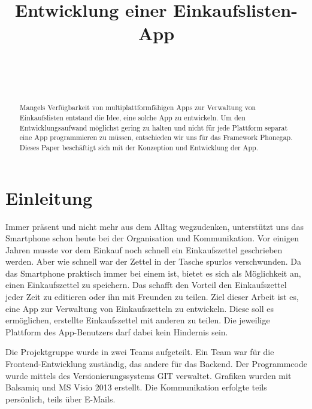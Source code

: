 \documentclass[10pt, conference, compsocconf]{IEEEtran}
\begin{document}
\title{Entwicklung einer Einkaufslisten-App}


\author{
\\
\and
{}
\\
}

\maketitle


\begin{abstract}
Mangels Verf\"ugbarkeit von multiplattformf\"ahigen Apps zur Verwaltung von Einkaufslisten entstand die Idee, eine solche App zu entwickeln. Um den Entwicklungsaufwand m\"oglichst gering zu halten und nicht f\"ur jede Plattform separat eine App programmieren zu müssen, entschieden wir uns f\"ur das Framework Phonegap. Dieses Paper besch\"aftigt sich mit der Konzeption und Entwicklung der App.   
\end{abstract}

\IEEEpeerreviewmaketitle

\section{Einleitung}
Immer pr\"asent und nicht mehr aus dem Alltag wegzudenken, unterst\"utzt  uns das Smartphone schon heute bei der Organisation und Kommunikation. 
Vor einigen Jahren musste vor dem Einkauf noch schnell ein Einkaufszettel geschrieben werden. 
Aber wie schnell war der Zettel  in der Tasche spurlos verschwunden. 
Da das Smartphone praktisch immer bei einem ist, bietet es sich als M\"oglichkeit an, einen Einkaufszettel zu speichern. 
Das schafft den Vorteil den Einkaufszettel jeder Zeit zu editieren oder ihn mit Freunden zu teilen. 
Ziel dieser Arbeit ist es, eine App zur Verwaltung von Einkaufszetteln zu entwickeln.
Diese soll es erm\"oglichen, erstellte Einkaufszettel mit anderen zu teilen.
Die jeweilige Plattform des App-Benutzers darf dabei kein Hindernis sein.

Die Projektgruppe wurde in zwei Teams aufgeteilt. 
Ein Team war f\"ur die Frontend-Entwicklung zust\"andig, das andere f\"ur das Backend. 
Der Programmcode wurde mittels des Versionierungssystems GIT verwaltet. 
Grafiken wurden mit Balsamiq und MS Visio 2013 erstellt. 
Die Kommunikation erfolgte teils pers\"onlich, teils \"uber E-Mails.
\end{document}
